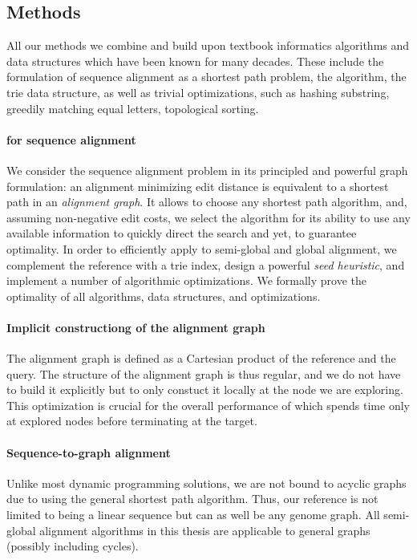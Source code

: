 \subsection*{Methods}

All our methods we combine and build upon textbook informatics algorithms and
data structures which have been known for many decades. These include the
formulation of sequence alignment as a shortest path problem, the \A algorithm,
the trie data structure, as well as trivial optimizations, such as hashing
substring, greedily matching equal letters, topological sorting.

\paragraph{\A for sequence alignment}
We consider the sequence alignment problem in its principled and powerful graph
formulation: an alignment minimizing edit distance is equivalent to a shortest
path in an \emph{alignment graph}. It allows to choose any shortest path
algorithm, and, assuming non-negative edit costs, we select the \A algorithm for
its ability to use any available information to quickly direct the search and
yet, to guarantee optimality. In order to efficiently apply \A to semi-global
and global alignment, we complement the reference with a trie index, design a
powerful \emph{seed heuristic}, and implement a number of algorithmic
optimizations. We formally prove the optimality of all algorithms, data
structures, and optimizations.

\paragraph{Implicit constructiong of the alignment graph}
The alignment graph is defined as a Cartesian product of the reference and the
query. The structure of the alignment graph is thus regular, and we do not have
to build it explicitly but to only constuct it locally at the node we are
exploring. This optimization is crucial for the overall performance of \A which
spends time only at explored nodes before terminating at the target.

\paragraph{Sequence-to-graph alignment}
Unlike most dynamic programming solutions, we are not bound to acyclic graphs
due to using the general \A shortest path algorithm. Thus, our reference is not
limited to being a linear sequence but can as well be any genome graph. All
semi-global alignment algorithms in this thesis are applicable to general graphs
(possibly including cycles).

